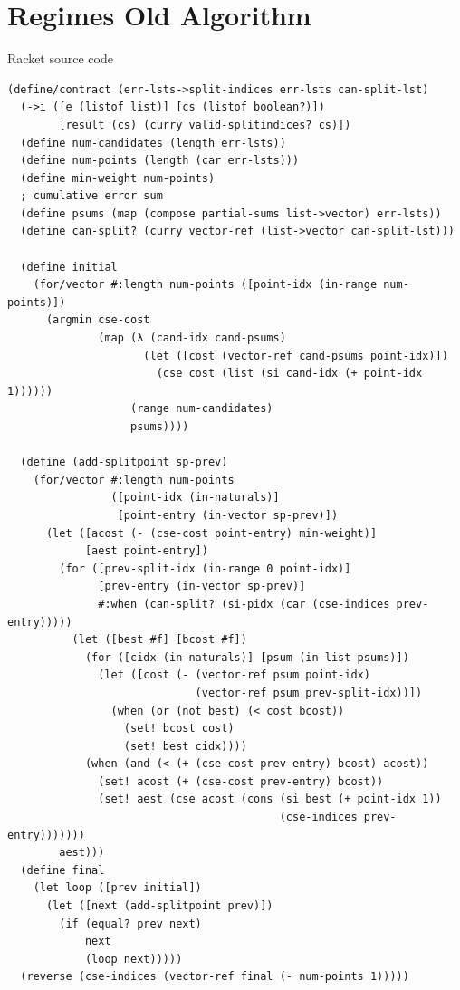 \documentclass{article}
\begin{document}
\section{Regimes Old Algorithm}
Racket source code
\label{appendix:old-algorithm} 
\begin{lstlisting}
(define/contract (err-lsts->split-indices err-lsts can-split-lst)
  (->i ([e (listof list)] [cs (listof boolean?)]) 
        [result (cs) (curry valid-splitindices? cs)])
  (define num-candidates (length err-lsts))
  (define num-points (length (car err-lsts)))
  (define min-weight num-points)
  ; cumulative error sum
  (define psums (map (compose partial-sums list->vector) err-lsts))
  (define can-split? (curry vector-ref (list->vector can-split-lst)))
  
  (define initial
    (for/vector #:length num-points ([point-idx (in-range num-points)])
      (argmin cse-cost
              (map (λ (cand-idx cand-psums)
                     (let ([cost (vector-ref cand-psums point-idx)])
                       (cse cost (list (si cand-idx (+ point-idx 1))))))
                   (range num-candidates)
                   psums))))

  (define (add-splitpoint sp-prev)
    (for/vector #:length num-points
                ([point-idx (in-naturals)]
                 [point-entry (in-vector sp-prev)])
      (let ([acost (- (cse-cost point-entry) min-weight)]
            [aest point-entry])
        (for ([prev-split-idx (in-range 0 point-idx)]
              [prev-entry (in-vector sp-prev)]
              #:when (can-split? (si-pidx (car (cse-indices prev-entry)))))
          (let ([best #f] [bcost #f])
            (for ([cidx (in-naturals)] [psum (in-list psums)])
              (let ([cost (- (vector-ref psum point-idx) 
                             (vector-ref psum prev-split-idx))])
                (when (or (not best) (< cost bcost))
                  (set! bcost cost)
                  (set! best cidx))))
            (when (and (< (+ (cse-cost prev-entry) bcost) acost))
              (set! acost (+ (cse-cost prev-entry) bcost))
              (set! aest (cse acost (cons (si best (+ point-idx 1)) 
                                          (cse-indices prev-entry)))))))
        aest)))
  (define final
    (let loop ([prev initial])
      (let ([next (add-splitpoint prev)])
        (if (equal? prev next)
            next
            (loop next)))))
  (reverse (cse-indices (vector-ref final (- num-points 1)))))
\end{lstlisting}
\newpage
\end{document}
